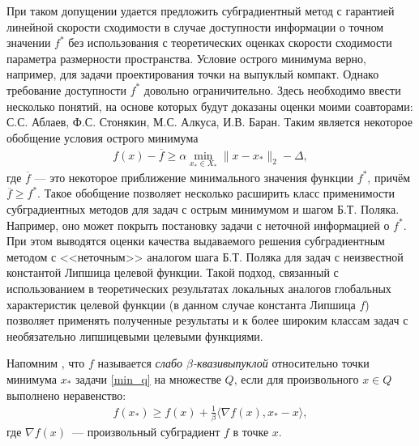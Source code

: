 При таком допущении удается предложить субградиентный метод с гарантией  линейной скорости сходимости в случае доступности информации о точном значении $f^*$ \cite{6} без использования с теоретических оценках скорости сходимости  параметра размерности пространства. Условие острого минимума верно, например, для задачи проектирования точки на выпуклый компакт. Однако требование доступности $f^*$ довольно ограничительно. Здесь необходимо ввести несколько понятий, на основе которых будут доказаны оценки \cite{sharp22} моими соавторами: С.С. Аблаев, Ф.С. Стонякин, М.С. Алкуса, И.В. Баран. Таким является некоторое обобщение условия острого минимума
\begin{gather}\label{eq_gen_sharp}
    f(x) - \overline{f} \geq \alpha \min_{x_* \in X_*} \|x - x_* \|_2 - \Delta,
\end{gather}
где $\overline{f}$  --- это некоторое приближение минимального значения функции $f^*$, причём $\overline{f} \geq f^*$. Такое обобщение позволяет несколько расширить класс применимости субградиентных методов для задач с острым минимумом и шагом Б.Т. Поляка. Например, оно может покрыть постановку задачи с неточной информацией о $f^*$. При этом выводятся оценки качества выдаваемого решения субградиентным методом с <<неточным>> аналогом шага Б.Т. Поляка для задач с неизвестной константой Липшица целевой функции. Такой подход, связанный с использованием в теоретических результатах локальных аналогов глобальных характеристик целевой функции (в данном случае константа Липшица $f$) позволяет применять полученные результаты и к более широким классам задач с необязательно липшицевыми целевыми функциями.  

Напомним \cite{7}, что $f$ называется \textit{слабо $\beta$-квазивыпуклой} относительно точки минимума $x_{*}$ задачи \eqref{min_q} на множестве $Q$, если для произвольного $x\in Q$ выполнено неравенство:
\begin{gather}\label{eqquasiconv}
f(x_{*})\geqslant f(x)+\frac{1}{\beta} \langle \nabla f(x), x_{*}-x \rangle,
\end{gather}
где $\nabla f(x)$~--- произвольный субградиент $f$ в точке $x$.

